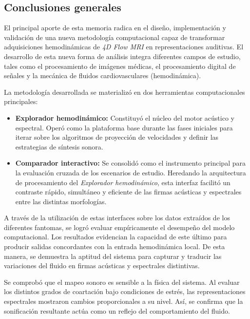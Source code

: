 \label{ch:conclusiones}

\subsection{Conclusiones generales}

El principal aporte de esta memoria radica en el diseño, implementación y validación de una nueva metodología computacional capaz de transformar adquisiciones hemodinámicas de \textit{4D Flow MRI} en representaciones auditivas. El desarrollo de esta nueva forma de análisis integra diferentes campos de estudio, tales como el procesamiento de imágenes médicas, el procesamiento digital de señales y la mecánica de fluidos cardiovasculares (hemodinámica).

La metodología desarrollada se materializó en dos herramientas computacionales principales:

\begin{itemize}
    \item \textbf{Explorador hemodinámico:} Constituyó el núcleo del motor acústico y espectral. Operó como la plataforma base durante las fases iniciales para iterar sobre los algoritmos de proyección de velocidades y definir las estrategias de síntesis sonora.

    \item \textbf{Comparador interactivo:} Se consolidó como el instrumento principal para la evaluación cruzada de los escenarios de estudio. Heredando la arquitectura de procesamiento del \textit{Explorador hemodinámico}, esta interfaz facilitó un contraste rápido, simultáneo y eficiente de las firmas acústicas y espectrales entre las distintas morfologías.
\end{itemize}

A través de la utilización de estas interfaces sobre los datos extraídos de los diferentes fantomas, se logró evaluar empíricamente el desempeño del modelo computacional. Los resultados evidencian la capacidad de este último para producir salidas concordantes con la entrada hemodinámica local. De esta manera, se demuestra la aptitud del sistema para capturar y traducir las variaciones del fluido en firmas acústicas y espectrales distintivas.

Se comprobó que el mapeo sonoro es sensible a la física del sistema. Al evaluar los distintos grados de coartación bajo condiciones de estrés, las representaciones espectrales mostraron cambios proporcionales a su nivel. Así, se confirma que la sonificación resultante actúa como un reflejo del comportamiento del fluido.


